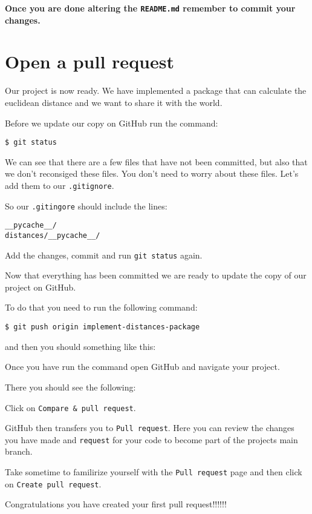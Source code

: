 \documentclass[11pt]{article}
\makeatletter
\newcommand{\boxspacing}{\kern\kvtcb@left@rule\kern\kvtcb@boxsep}
\newcommand{\prompt}[4]{
        \ttfamily\llap{{\color{#2}[#3]:\hspace{3pt}#4}}\vspace{-\baselineskip}
    }
\makeatother
\begin{document}
\textbf{Once you are done altering the \texttt{README.md} remember to
commit your changes.}

    \hypertarget{open-a-pull-request}{%
\section{Open a pull request}\label{open-a-pull-request}}

    Our project is now ready. We have implemented a package that can
calculate the euclidean distance and we want to share it with the world.

Before we update our copy on GitHub run the command:

\begin{verbatim}
$ git status
\end{verbatim}

We can see that there are a few files that have not been committed, but
also that we don't reconsiged these files. You don't need to worry about
these files. Let's add them to our \texttt{.gitignore}.

So our \texttt{.gitingore} should include the lines:

\begin{verbatim}
__pycache__/
distances/__pycache__/
\end{verbatim}

Add the changes, commit and run \texttt{git\ status} again.

    Now that everything has been committed we are ready to update the copy
of our project on GitHub.

To do that you need to run the following command:

\begin{verbatim}
$ git push origin implement-distances-package
\end{verbatim}

and then you should something like this:

    Once you have run the command open GitHub and navigate your project.

There you should see the following:

Click on \texttt{Compare\ \&\ pull\ request}.

GitHub then transfers you to \texttt{Pull\ request}. Here you can review
the changes you have made and \texttt{request} for your code to become
part of the projects main branch.

Take sometime to familirize yourself with the \texttt{Pull\ request}
page and then click on \texttt{Create\ pull\ request}.

Congratulations you have created your first pull request!!!!!!

    \begin{tcolorbox}[breakable, size=fbox, boxrule=1pt, pad at break*=1mm,colback=cellbackground, colframe=cellborder]
\prompt{In}{incolor}{ }{\boxspacing}
\begin{Verbatim}[commandchars=\\\{\}]

\end{Verbatim}
\end{tcolorbox}


    
    
    
\end{document}
